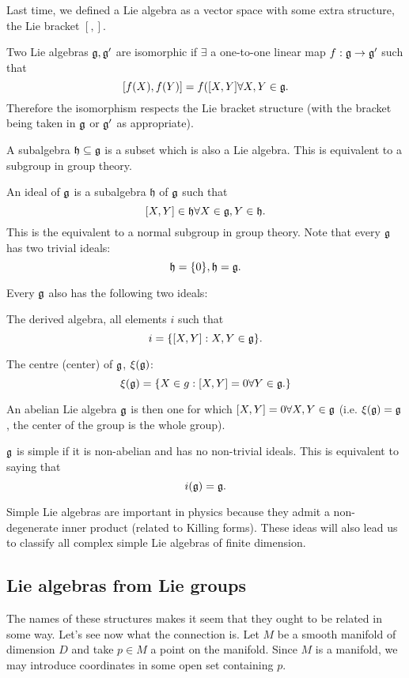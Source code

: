 Last time, we defined a Lie algebra as a vector space with some extra structure, the Lie bracket $[,]$.
\begin{defn}
Two Lie algebras $\mathfrak{g},\mathfrak{g}'$ are isomorphic if $\exists$ a one-to-one linear map $f:\mathfrak{g}\to \mathfrak{g}'$ such that
$$[f(X),f(Y)]=f([X,Y]\forall X,Y\in \mathfrak{g}.$$
Therefore the isomorphism respects the Lie bracket structure (with the bracket being taken in $\mathfrak{g}$ or $\mathfrak{g}'$ as appropriate).
\end{defn}
\begin{defn}
A subalgebra $\mathfrak{h}\subseteq \mathfrak{g}$ is a subset which is also a Lie algebra. This is equivalent to a subgroup in group theory.
\end{defn}
\begin{defn}
An ideal of $\mathfrak{g}$ is a subalgebra $\mathfrak{h}$ of $\mathfrak{g}$ such that
$$[X,Y]\in \mathfrak{h}\forall X \in \mathfrak{g}, Y \in \mathfrak{h}.$$
This is the equivalent to a normal subgroup in group theory. Note that every $\mathfrak{g}$ has two trivial ideals:
$$\mathfrak{h}=\{0\}, \mathfrak{h}=\mathfrak{g}.$$
\end{defn}

Every $\mathfrak{g}$ also has the following two ideals:
\begin{exm}
The derived algebra, all elements $i$ such that
$$i=\{[X,Y]: X,Y\in \mathfrak{g}\}.$$
\end{exm}
\begin{exm}
The centre (center) of $\mathfrak{g}$, $\xi(\mathfrak{g})$:
$$\xi(\mathfrak{g})=\{X\in g: [X,Y]=0 \forall Y\in \mathfrak{g}.\}$$
\end{exm}

\begin{defn}
An abelian Lie algebra $\mathfrak{g}$ is then one for which $[X,Y]=0\forall X, Y \in \mathfrak{g}$ (i.e. $\xi(\mathfrak{g})=\mathfrak{g}$, the center of the group is the whole group).
\end{defn}
\begin{defn}
$\mathfrak{g}$ is simple if it is non-abelian and has no non-trivial ideals. This is equivalent to saying that
$$i(\mathfrak{g})=\mathfrak{g}.$$
\end{defn}
Simple Lie algebras are important in physics because they admit a non-degenerate inner product (related to Killing forms). These ideas will also lead us to classify all complex simple Lie algebras of finite dimension.

\subsection*{Lie algebras from Lie groups} The names of these structures makes it seem that they ought to be related in some way. Let's see now what the connection is. Let $M$ be a smooth manifold of dimension $D$ and take $p\in M$ a point on the manifold. Since $M$ is a manifold, we may introduce coordinates in some open set containing $p$. 

